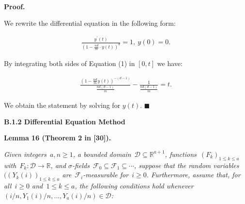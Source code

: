 \documentclass[10pt,a4paper]{article}
\begin{document}



\par\medskip\noindent\textbf{Proof.}\par



We rewrite the differential equation in the following form:\par


\[\begin{gathered}
\displaystyle\frac{y^{\prime}(t)}{\left(1-\frac{nd}{m}\cdot y(t)\right)^{d}}=1,\ y(0)=0.
\end{gathered}\]


By integrating both sides of Equation (1) in $[0,t]$ we have:\par


\[\begin{gathered}
\displaystyle\frac{\left(1-\frac{nd}{m}y(t)\right)^{-(d-1)}}{\frac{nd(d-1)}{m}}-\frac{1}{\frac{nd(d-1)}{m}}=t.
\end{gathered}\]


We obtain the statement by solving for $y(t)$.
\ensuremath{\blacksquare}\par






\par\medskip\noindent\textbf{B.1.2 Differential Equation Method}\par





\par\medskip\noindent\textbf{\textbf{Lemma 16}\textbf{ }(Theorem 2 in [30])\textbf{.}}\par



\emph{Given integers $a,n\geq 1$,
a bounded domain $\mathcal{D}\subseteq\mathbb{R}^{a+1}$,
functions $(F_{k})_{1\leq k\leq a}$ with $F_{k}:\mathcal{D}\to\mathbb{R}$,
and $\sigma$-fields $\mathcal{F}_{0}\subseteq\mathcal{F}_{1}\subseteq\cdots$,
suppose that the random variables $((Y_{k}(i))_{1\leq k\leq a}$ are $\mathcal{F}_{i}$-measurable for $i\geq 0$.
Furthermore, assume that, for all $i\geq 0$ and $1\leq k\leq a$, the following
conditions hold whenever $(i/n,Y_{1}(i)/n,...,Y_{a}(i)/n)\in\mathcal{D}$:}\par
\end{document}
